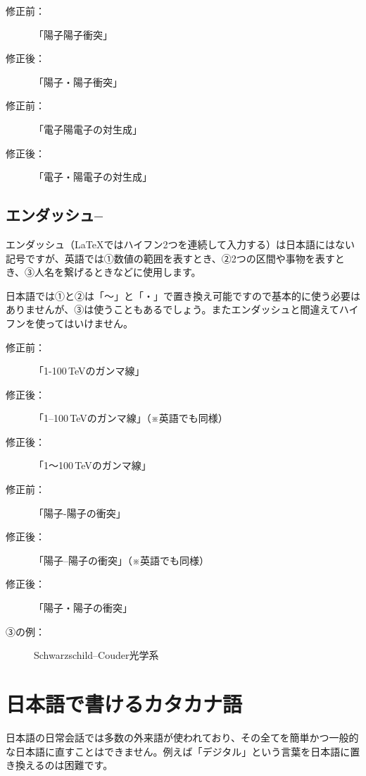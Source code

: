 \begin{description}
\item[修正前：]「陽子陽子衝突」
\item[修正後：]「陽子・陽子衝突」
\end{description}

\begin{description}
\item[修正前：]「電子陽電子の対生成」
\item[修正後：]「電子・陽電子の対生成」
\end{description}

\subsection{エンダッシュ--}

エンダッシュ（\LaTeX ではハイフン2つを連続して入力する）は日本語にはない記号ですが、英語では①数値の範囲を表すとき、②2つの区間や事物を表すとき、③人名を繋げるときなどに使用します。

日本語では①と②は「〜」と「・」で置き換え可能ですので基本的に使う必要はありませんが、③は使うこともあるでしょう。またエンダッシュと間違えてハイフンを使ってはいけません。

\begin{description}
\item[修正前：]「1-100\,TeVのガンマ線」
\item[修正後：]「1--100\,TeVのガンマ線」（※英語でも同様）
\item[修正後：]「1〜100\,TeVのガンマ線」
\end{description}

\begin{description}
\item[修正前：]「陽子-陽子の衝突」
\item[修正後：]「陽子--陽子の衝突」（※英語でも同様）
\item[修正後：]「陽子・陽子の衝突」
\end{description}

\begin{description}
\item[③の例：]Schwarzschild--Couder光学系
\end{description}

\section{日本語で書けるカタカナ語}

日本語の日常会話では多数の外来語が使われており、その全てを簡単かつ一般的な日本語に直すことはできません。例えば「デジタル」という言葉を日本語に置き換えるのは困難です。

